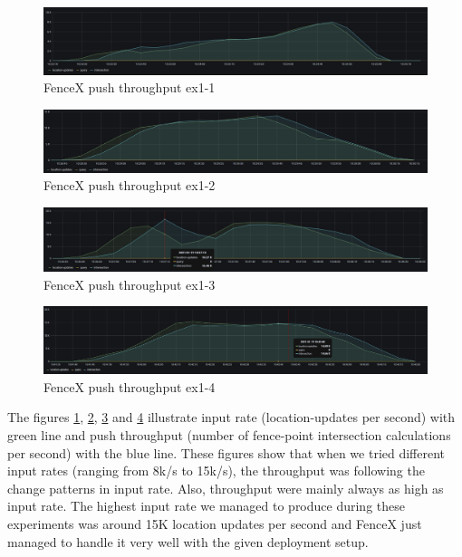\documentclass[a4]{report}
\begin{document}
    \begin{figure}[h!]
        \centering
        \caption{FenceX push throughput ex1-1}
        \label{fig:ex1-1}
        \includegraphics[width=\linewidth, scale=2]{images/evaluation/ex1-benchmarking(15,6).png}
    \end{figure}

    \begin{figure}[h!]
        \centering
        \caption{FenceX push throughput ex1-2}
        \label{fig:ex1-2}
        \includegraphics[width=\linewidth, scale=2]{images/evaluation/ex1-benchmarking(19,7).png}
    \end{figure}

    \begin{figure}[h!]
        \centering
        \caption{FenceX push throughput ex1-3}
        \label{fig:ex1-3}
        \includegraphics[width=\linewidth, scale=2]{images/evaluation/ex1-benchmarking(22,9).png}
    \end{figure}

    \begin{figure}[h!]
        \centering
        \caption{FenceX push throughput ex1-4}
        \label{fig:ex1-4}
        \includegraphics[width=\linewidth, scale=2]{images/evaluation/ex1-benchmarking(23,10).png}
    \end{figure}

    The figures \ref{fig:ex1-1}, \ref{fig:ex1-2}, \ref{fig:ex1-3} and \ref{fig:ex1-4} illustrate input rate
    (location-updates per second) with green line and push throughput (number of fence-point intersection
    calculations per second) with the blue line.
    These figures show that when we tried different input rates (ranging from 8k/s to 15k/s), the throughput was
    following the change patterns in input rate.
    Also, throughput were mainly always as high as input rate.
    The highest input rate we managed to produce during these experiments was around 15K location updates per second
    and FenceX just managed to handle it very well with the given deployment setup.
\end{document}
